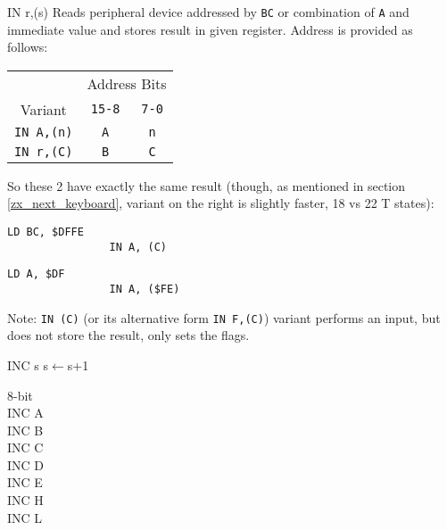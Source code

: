 \documentclass[12pt,twoside,openright,a4paper]{book}
\begin{document}
\begin{basedescript}{
	\desclabelstyle{\multilinelabel}
	\desclabelwidth{3cm}}
\begin{detailitem}{IN r,(s)}
		Reads peripheral device addressed by {\tt BC} or combination of {\tt A} and immediate value and stores result in given register. Address is provided as follows:

		\begin{tabular}{ccc}
			& \multicolumn{2}{c}{Address Bits} \\
			Variant & {\tt 15-8} & {\tt 7-0} \\
			\hline
			{\tt IN A,(n)} & {\tt A} & {\tt n} \\
			{\tt IN r,(C)} & {\tt B} & {\tt C} \\
		\end{tabular}
		\vspace{1ex} %

		So these 2 have exactly the same result (though, as mentioned in section \ref{zx_next_keyboard}, variant on the right is slightly faster, 18 vs 22 T states):

		\begin{multicols}{2}
			\begin{Verbatim}[gobble=4]
				LD BC, $DFFE
				IN A, (C)
			\end{Verbatim}
			\columnbreak
			\begin{Verbatim}[gobble=4]
				LD A, $DF
				IN A, ($FE)
			\end{Verbatim}
		\end{multicols}

		Note: {\tt IN (C)} (or its alternative form {\tt IN F,(C)}) variant performs an input, but does not store the result, only sets the flags.

		\begin{DetailEffects}[p]
			\DetailFlags[{\tt IN A,(n)} (no effect)]{\FN}{\FN}{\FN}{\FN}{\FN}{\FN}
		\end{DetailEffects}
						
		\begin{DetailTiming}
		\end{DetailTiming}

	\end{detailitem}

	\begin{detailitem}{INC s}
		{s$\leftarrow$s+1}

		\begin{DetailVariants}
			\textnormal{8-bit}\\
			INC A\\
			INC B\\
			INC C\\
			INC D\\
			INC E\\
			INC H\\
			INC L


\end{DetailVariants}
\end{detailitem}
\end{basedescript}
\end{document}

